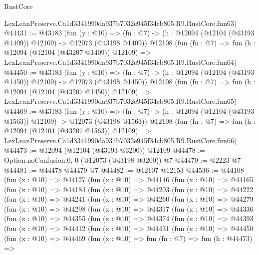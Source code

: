 \begin{lexlean}{RustCore}
\begin{coremodule}
    LexLeanPreserve.Ca1d3341990da937b7032e945f34cb805.R9.RustCore.fun63)
@44431 := @43183
    (fun (y : @10) =>
    (fn : @7) -> (h : @12094 (@12104 (@43193 @1409)) @12109) -> @12073 (@43198 @1409))
    @12108
    (fun (fn : @7) =>
    fun (h : @12094 (@12104 (@43207 @1409)) @12109) =>
    LexLeanPreserve.Ca1d3341990da937b7032e945f34cb805.R9.RustCore.fun64)
@44450 := @43183
    (fun (y : @10) =>
    (fn : @7) -> (h : @12094 (@12104 (@43193 @1450)) @12109) -> @12073 (@43198 @1450))
    @12108
    (fun (fn : @7) =>
    fun (h : @12094 (@12104 (@43207 @1450)) @12109) =>
    LexLeanPreserve.Ca1d3341990da937b7032e945f34cb805.R9.RustCore.fun65)
@44469 := @43183
    (fun (y : @10) =>
    (fn : @7) -> (h : @12094 (@12104 (@43193 @1563)) @12109) -> @12073 (@43198 @1563))
    @12108
    (fun (fn : @7) =>
    fun (h : @12094 (@12104 (@43207 @1563)) @12109) =>
    LexLeanPreserve.Ca1d3341990da937b7032e945f34cb805.R9.RustCore.fun66)
@44473 := @12094 (@12104 (@43193 @3200)) @12109
@44478 := Option.noConfusion.{0, 0} (@12073 (@43198 @3200)) @7
@44479 := @2223 @7
@44481 := @44478 @44479 @7
@44482 := @12107 @12153
@44536 := @44108
    (fun (x : @10) =>
    @44127
      (fun (x : @10) =>
      @44146
        (fun (x : @10) =>
        @44165
          (fun (x : @10) =>
          @44184
            (fun (x : @10) =>
            @44203
              (fun (x : @10) =>
              @44222
                (fun (x : @10) =>
                @44241
                  (fun (x : @10) =>
                  @44260
                    (fun (x : @10) =>
                    @44279
                      (fun (x : @10) =>
                      @44298
                        (fun (x : @10) =>
                        @44317
                          (fun (x : @10) =>
                          @44336
                            (fun (x : @10) =>
                            @44355
                              (fun (x : @10) =>
                              @44374
                                (fun (x : @10) =>
                                @44393
                                  (fun (x : @10) =>
                                  @44412
                                    (fun (x : @10) =>
                                    @44431
                                      (fun (x : @10) =>
                                      @44450
                                        (fun (x : @10) =>
                                        @44469
                                          (fun (x : @10) =>
                                          fun (fn : @7) =>
                                          fun (h : @44473) =>

\end{coremodule}
\end{lexlean}

